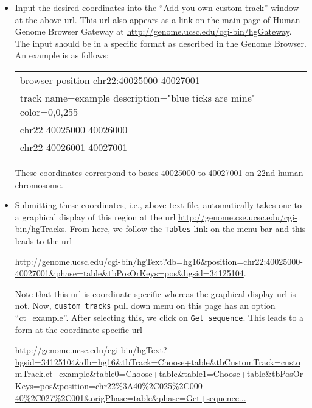 \documentclass[notitlepage,11pt]{article}
\begin{document}
\begin{itemize}
\item Input the desired coordinates into the ``Add you own custom track'' window at the above url. This url also appears as a 
link on the main page of Human Genome Browser Gateway at \url{http://genome.ucsc.edu/cgi-bin/hgGateway}. 
The input should be in a specific 
format as described in the Genome Browser. An example is as follows:


\begin{center}
\begin{tabular}{|l|}
\hline
browser position chr22:40025000-40027001\\
track name=example description="blue ticks are mine" color=0,0,255\\
chr22   40025000 40026000\\
chr22   40026001 40027001\\
\hline
\end{tabular}
\end{center}


These coordinates correspond to bases 40025000 to 40027001 on 22nd human chromosome.

\item Submitting these coordinates, i.e., above text file, 
 automatically takes one to a graphical display of this region at the url 
\url{http://genome.cse.ucsc.edu/cgi-bin/hgTracks}. From here, we follow the  \texttt{Tables} link on the menu bar and this leads 
to  the url

\noindent
\url{http://genome.ucsc.edu/cgi-bin/hgText?db=hg16&position=chr22:40025000-40027001&phase=table&tbPosOrKeys=pos&hgsid=34125104}.

\noindent
Note that this url is coordinate-specific whereas the graphical display url is not.
Now, \texttt{custom tracks} pull down menu on this page has an option ``ct\_example''. After selecting this, we click on 
\texttt{Get sequence}. This leads to  a form at the coordinate-specific  url  

\noindent
\url{http://genome.ucsc.edu/cgi-bin/hgText?hgsid=34125104&db=hg16&tbTrack=Choose+table&tbCustomTrack=customTrack.ct_example&table0=Choose+table&table1=Choose+table&tbPosOrKeys=pos&position=chr22\%3A40\%2C025\%2C000-40\%2C027\%2C001&origPhase=table&phase=Get+sequence...}


\end{itemize}
\end{document}
